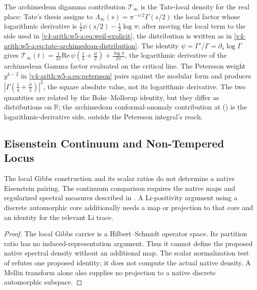 \begin{remark}
\label{v4-arith:w5-a:rem:archimedean-obstruction}
The archimedean digamma contribution \(\mathcal{T}_{\infty}\) is the
Tate-local density for the real place: Tate's thesis assigns to
\(\Lambda_{\infty}(s)=\pi^{-s/2}\Gamma(s/2)\) the local factor whose
logarithmic derivative is
\(\frac12\psi(s/2)-\frac12\log\pi\); after moving the local term to
the side used in \eqref{v4-arith:w5-a:eq:weil-explicit}, the
distribution is written as in
\eqref{v4-arith:w5-a:eq:tate-archimedean-distribution}.
The identity \(\psi=\Gamma'/\Gamma=\partial_{s}\log\Gamma\) gives
\(\mathcal{T}_{\infty}(t)=\frac{1}{2\pi}\mathrm{Re}\,\psi(\tfrac14+\tfrac{it}{2})+\frac{\log\pi}{2\pi}\),
the logarithmic derivative of the archimedean Gamma factor evaluated
on the critical line. The Petersson weight \(y^{k-2}\) in
\eqref{v4-arith:w5-a:eq:petersson} pairs against the modular form
and produces \(|\Gamma(\tfrac{1}{4}+\tfrac{it}{2})|^{2}\), the
square absolute value, not its logarithmic derivative. The two
quantities are related by the Bohr--Mollerup identity, but they
differ as distributions on \(\mathbb{R}\); the archimedean
conformal-anomaly contribution at () is the
logarithmic-derivative side, outside the Petersson integral's reach.
\end{remark}

\subsection{Eisenstein Continuum and Non-Tempered Locus}
\label{v4-arith:w5-a:obstruction:eisenstein}

\begin{proposition}
\label{v4-arith:w5-a:prop:eisenstein-residual}
The local Gibbs construction and its scalar ratios do not determine a
native Eisenstein pairing. The continuum comparison requires the native
maps and regularized spectral measures described in
. A Li-positivity argument
using a discrete automorphic core additionally needs a map or projection
to that core and an identity for the relevant Li trace.
\end{proposition}
\begin{proof}
The local Gibbs carrier is a Hilbert--Schmidt operator space. Its
partition ratio has no induced-representation argument. Thus it cannot
define the proposed native spectral density without an additional map.
The scalar normalization test of
 refutes one proposed identity;
it does not compute the actual native density. A Mellin transform alone
also supplies no projection to a native discrete automorphic subspace.
\end{proof}

